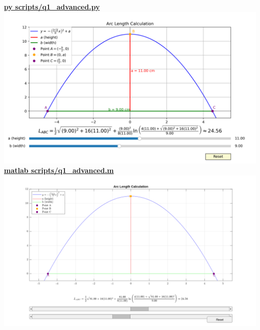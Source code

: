 \documentclass[a4paper, 12pt]{report}
\def\link{blue!50!black}
\begin{document}
    \href{https://github.com/sakx7/mathcompuni/blob/main/py scripts/q1_advanced.py}{\textcolor{\link}{\textbf{py scripts/q1\_advanced.py}}}\\
    \includegraphics[width=1\textwidth]{images/Figure_1.png}\\
    \href{https://github.com/sakx7/mathcompuni/blob/main/matlab scripts/q1_advanced.m}{\textcolor{\link}{\textbf{matlab scripts/q1\_advanced.m}}}
    \includegraphics[width=1\textwidth]{images/rmatFigure_1.png}\\
   

    
\end{document}

